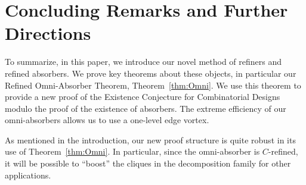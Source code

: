 \documentclass[11pt]{article}
\newcounter{i}
\theoremstyle{plain}
\theoremstyle{plain} %
\theoremstyle{definition}
\begin{document}


\section{Concluding Remarks and Further Directions}\label{s:Conclusion}

To summarize, in this paper, we introduce our novel method of refiners and refined absorbers. We prove key theorems about these objects, in particular our Refined Omni-Absorber Theorem, Theorem~\ref{thm:Omni}. We use this theorem to provide a new proof of the Existence Conjecture for Combinatorial Designs modulo the proof of the existence of absorbers. The extreme efficiency of our omni-absorbers allows us to use a one-level edge vortex. 

As mentioned in the introduction, our new proof structure is quite robust in its use of Theorem~\ref{thm:Omni}. In particular, since the omni-absorber is $C$-refined, it will be possible to ``boost'' the cliques in the decomposition family for other applications.
\end{document}
